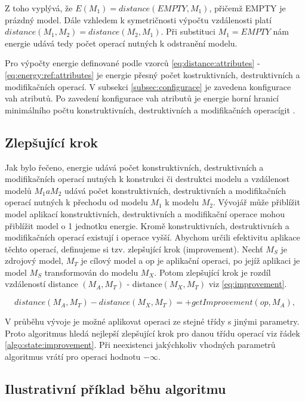 \documentclass[11pt,twoside,a4paper]{book}
\begin{document}
Z toho vyplývá, že $E(M_1) = distance(EMPTY, M_1)$, přičemž EMPTY je prázdný
model. Dále vzhledem k symetričnosti výpočtu vzdálenosti platí $distance(M_1,
M_2) = distance(M_2, M_1)$. Při substituci $M_1 = EMPTY$ nám energie udává tedy
počet operací nutných k odstranění modelu.

Pro výpočty energie definované podle vzorců \eqref{eq:distance:attributes} -
\eqref{eq:energy:ref:attributes} je energie přesný počet kostruktivních,
destruktivních a modifikačních operací. V subsekci \ref{subsec:configurace} je
zavedena konfigurace vah atributů. Po zavedení konfigurace vah atributů je
energie horní hranicí minimálního počtu konstruktivních, destruktivních a
modifikačních operacígit .

\subsection{Zlepšující krok}
Jak bylo řečeno, energie udává počet konstruktivních, destruktivních a
modifikačních operací nutných k konstrukci či destruktci modelu a vzdálenost
modelů $M_1 a M_2$ udává počet konstruktivních, destruktivních a
modifikačních operací nutných k přechodu od modelu $M_1$ k modelu $M_2$.
Vývojář může přiblížit model aplikací konstruktivních, destruktivních a
modifikační operace mohou přiblížit model o 1 jednotku energie. Kromě
konstruktivních, destruktivních a modifikačních operací existují i operace
vyšší. Abychom určili efektivitu aplikace těchto operací, definujeme si tzv.
zlepšující krok (improvement). Nechť $M_S$ je zdrojový model,
$M_T$ je cílový model a op je aplikační operaci, po jejíž aplikaci je model
$M_S$ transformován do modelu $M_X$. Potom zlepšující krok je rozdíl vzdáleností
distance $(M_A, M_T)$ - distance$(M_X, M_T)$ viz \eqref{eq:improvement}.

\begin{equation}distance(M_A, M_T)-distance(M_X, M_T) =  + getImprovement(op,
M_A),
\label{eq:improvement}\end{equation}


V průběhu vývoje je možné aplikovat operaci ze stejné třídy s jinými parametry.
Proto algoritmus hledá nejlepší zlepšující krok pro danou třídu operací viz
řádek \ref{algo:state:improvement}. Při neexistenci jakýchkoliv vhodných
parametrů algoritmus vrátí pro operaci hodnotu $-\infty$.


\subsection{Ilustrativní příklad běhu algoritmu}
\end{document}
